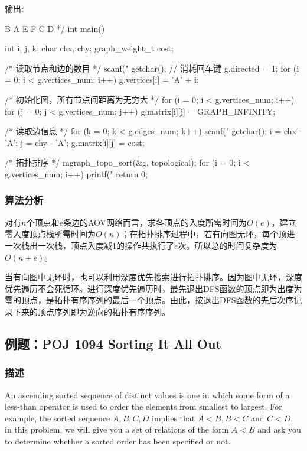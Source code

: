 \begin{Codex}[label=mgraph_topo_sort.c]
输出:

B A E F C D
*/
int main() {
    int i, j, k;
    char chx, chy;
    graph_weight_t cost;

    /* 读取节点和边的数目 */
    scanf("%
    getchar(); // 消耗回车键
    g.directed = 1;
    for (i = 0; i < g.vertices_num; i++) g.vertices[i] = 'A' + i;

    /* 初始化图，所有节点间距离为无穷大 */
    for (i = 0; i < g.vertices_num; i++) {
        for (j = 0; j < g.vertices_num; j++) {
            g.matrix[i][j] = GRAPH_INFINITY;
        }
    }

    /* 读取边信息 */
    for (k = 0; k < g.edges_num; k++) {
        scanf("%
        getchar();
        i = chx - 'A';
        j = chy - 'A';
        g.matrix[i][j] = cost;
    }

    /* 拓扑排序 */
    mgraph_topo_sort(&g, topological);
    for (i = 0; i < g.vertices_num; i++) {
        printf("%
    }
    return 0;
}
\end{Codex}

\subsubsection{算法分析}
对有$n$个顶点和$e$条边的AOV网络而言，求各顶点的入度所需时间为$O(e)$，建立零入度顶点栈所需时间为$O(n)$；在拓扑排序过程中，若有向图无环，每个顶进一次栈出一次栈，顶点入度减1的操作共执行了$e$次。所以总的时间复杂度为$O(n+e)$。

当有向图中无环时，也可以利用深度优先搜索进行拓扑排序。因为图中无环，深度优先遍历不会死循环。进行深度优先遍历时，最先退出DFS函数的顶点即为出度为零的顶点，是拓扑有序序列的最后一个顶点。由此，按退出DFS函数的先后次序记录下来的顶点序列即为逆向的拓扑有序序列。


\subsection{例题：POJ 1094 Sorting It All Out}
\subsubsection{描述}
An ascending sorted sequence of distinct values is one in which some form of a less-than operator is used to order the elements from smallest to largest. For example, the sorted sequence $A, B, C, D$ implies that $A < B, B < C$ and $C < D$. in this problem, we will give you a set of relations of the form $A < B$ and ask you to determine whether a sorted order has been specified or not.

